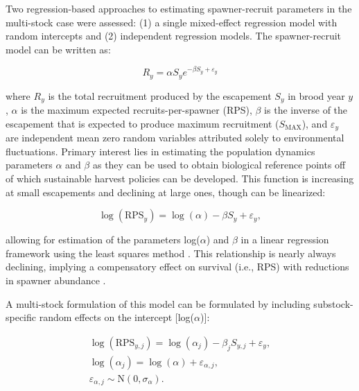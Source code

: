 \documentclass[12pt,]{book}
\theoremstyle{definition}
\theoremstyle{definition}
\theoremstyle{definition}
\theoremstyle{remark}
\begin{document}
\noindent
Two regression-based approaches to estimating \citet{ricker-1954}
spawner-recruit parameters in the multi-stock case were assessed: (1) a
single mixed-effect regression model with random intercepts and (2)
independent regression models. The \citet{ricker-1954} spawner-recruit
model can be written as:

\begin{equation}
  R_y=\alpha S_y e^{-\beta S_y + \varepsilon_y}
  \label{eq:basic-ricker}
\end{equation}

\noindent
where \(R_y\) is the total recruitment produced by the escapement
\(S_y\) in brood year \(y\), \(\alpha\) is the maximum expected
recruits-per-spawner (RPS), \(\beta\) is the inverse of the escapement
that is expected to produce maximum recruitment (\(S_{\text{MAX}}\)),
and \(\varepsilon_y\) are independent mean zero random variables
attributed solely to environmental fluctuations. Primary interest lies
in estimating the population dynamics parameters \(\alpha\) and
\(\beta\) as they can be used to obtain biological reference points off
of which sustainable harvest policies can be developed. This function is
increasing at small escapements and declining at large ones, though can
be linearized:

\begin{equation}
  \log(\text{RPS}_y)=\log(\alpha)-\beta S_y + \varepsilon_y,
  \label{eq:lin-ricker-fixed}
\end{equation}

\noindent
allowing for estimation of the parameters log(\(\alpha\)) and \(\beta\)
in a linear regression framework using the least squares method
\citep{hilborn-walters-1992, clark-etal-2009}. This relationship is
nearly always declining, implying a compensatory effect on survival
(i.e., RPS) with reductions in spawner abundance \citep{rose-etal-2001}.

A multi-stock formulation of this model can be formulated by including
substock-specific random effects on the intercept {[}log(\(\alpha\)){]}:

\begin{equation}
  \begin{split}
    \log(\text{RPS}_{y,j})=\log(\alpha_j)-\beta_j S_{y,j} + \varepsilon_y, \\
    \log(\alpha_j)=\log(\alpha) + \varepsilon_{\alpha,j}, \\
    \varepsilon_{\alpha,j} \sim \text{N}(0,\sigma_{\alpha}). \\
  \end{split}
\label{eq:lin-ricker-mixed}
\end{equation}
\end{document}
